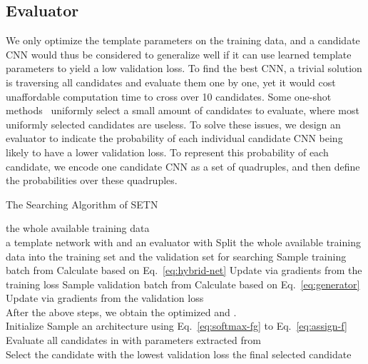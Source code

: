 \documentclass[10pt,twocolumn,letterpaper]{article}
\def\Eqref#1{{Eq.~\eqref{#1}}}
\def\NAME{{SETN}}
\begin{document}
\subsection{Evaluator}\label{sec:network-evaluator}

We only optimize the template parameters on the training data, and a candidate CNN would thus be considered to generalize well if it can use learned template parameters to yield a low validation loss.
To find the best CNN, a trivial solution is traversing all candidates and evaluate them one by one, yet it would cost unaffordable computation time to cross over 10 candidates.
Some one-shot methods~\cite{bender2018understanding,brock2018smash} uniformly select a small amount of candidates to evaluate, where most uniformly selected candidates are useless.
To solve these issues, we design an evaluator to indicate the probability of each individual candidate CNN being likely to have a lower validation loss.
To represent this probability of each candidate, we encode one candidate CNN as a set of quadruples, and then define the probabilities over these quadruples.




\begin{algorithm}[t!]
\small
\caption{
The Searching Algorithm of {\NAME}
}
\label{alg:{\NAME}}
\small
\begin{algorithmic}
\Require        the whole available training data \\
\hspace{0.65cm} a template network with  and an evaluator with 
\State Split the whole available training data into the training set  and the validation set  for searching
       
  \State Sample training batch {\small } from 
  \State Calculate {\small} based on \Eqref{eq:hybrid-net}
  \State Update  via gradients from the training loss {\small }
  \State Sample validation batch {\small } from 
  \State Calculate {\small} based on \Eqref{eq:generator}
  \State Update  via gradients from the validation loss {\small }
\EndWhile \\
After the above steps, we obtain the optimized  and . \\
Initialize  
  \State Sample an architecture  using \Eqref{eq:softmax-fg} to \Eqref{eq:assign-f}
  \State 
\EndFor \\
Evaluate all candidates in  with parameters extracted from  \\
Select the candidate with the lowest validation loss
\Ensure the final selected candidate
\end{algorithmic}
  
\end{algorithm}
\end{document}
